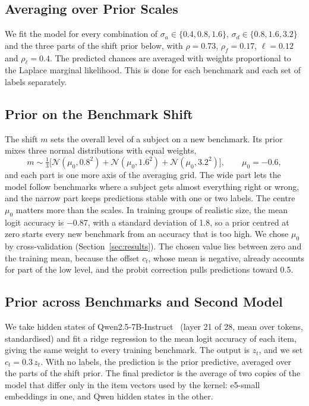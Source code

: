\documentclass{article}
\begin{document}
\subsection{Averaging over Prior Scales}
We fit the model for every combination of $\sigma_a\in\{0.4,0.8,1.6\}$, $\sigma_d\in\{0.8,1.6,3.2\}$ and the three
parts of the shift prior below, with $\rho=0.73$, $\rho_f=0.17$, $\ell=0.12$ and $\rho_\ell=0.4$. The predicted
chances are averaged with weights proportional to the Laplace marginal likelihood. This is done for each benchmark and
each set of labels separately.

\subsection{Prior on the Benchmark Shift}\label{sec:shift}
The shift $m$ sets the overall level of a subject on a new benchmark. Its prior mixes three normal distributions with
equal weights,
\begin{equation}
m \sim \tfrac13\big[\mathcal{N}(\mu_0, 0.8^2) + \mathcal{N}(\mu_0, 1.6^2) + \mathcal{N}(\mu_0, 3.2^2)\big],
\qquad \mu_0=-0.6,
\end{equation}
and each part is one more axis of the averaging grid. The wide part lets the model follow benchmarks where a subject
gets almost everything right or wrong, and the narrow part keeps predictions stable with one or two labels. The centre
$\mu_0$ matters more than the scales. In training groups of realistic size, the mean logit accuracy is $-0.87$, with a
standard deviation of 1.8, so a prior centred at zero starts every new benchmark from an accuracy that is too high. We
chose $\mu_0$ by cross-validation (Section~\ref{sec:results}). The chosen value lies between zero and the training
mean, because the offset $c_t$, whose mean is negative, already accounts for part of the low level, and the probit
correction pulls predictions toward 0.5.

\subsection{Prior across Benchmarks and Second Model}\label{sec:prior}
We take hidden states of Qwen2.5-7B-Instruct~\citep{qwen2025qwen25technicalreport} (layer 21 of 28, mean over tokens,
standardised) and fit a ridge regression to the mean logit accuracy of each item, giving the same weight to every
training benchmark. The output is $z_t$, and we set $c_t = 0.3\,z_t$. With no labels, the prediction is the prior
predictive, averaged over the parts of the shift prior. The final predictor is the average of two copies of the model
that differ only in the item vectors used by the kernel: e5-small embeddings in one, and Qwen hidden states in the
other.
\end{document}
